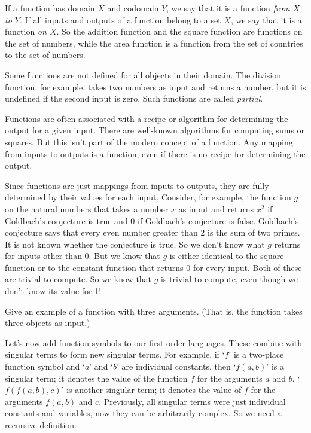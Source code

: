 If a function has domain $X$ and codomain $Y$,
we say that it is a function \emph{from $X$ to $Y$}.
If all inputs and outputs of a function belong to a set $X$,
we say that it is a function \emph{on $X$}.
So the addition function and the square function are functions on the set of numbers,
while the area function is a function from the set of countries to the set of numbers.

Some functions are not defined for all objects in their domain.
The division function, for example, takes two numbers as input and returns a number,
but it is undefined if the second input is zero.
Such functions are called \emph{partial}.

Functions are often associated with a recipe or algorithm
for determining the output for a given input.
There are well-known algorithms for computing sums or squares.
But this isn't part of the modern concept of a function.
Any mapping from inputs to outputs is a function,
even if there is no recipe for determining the output.

Since functions are just mappings from inputs to outputs,
they are fully determined by their values for each input.
Consider, for example, the function $g$ on the natural numbers that
takes a number $x$ as input and returns
$x^{2}$ if Goldbach's conjecture is true
and $0$ if Goldbach's conjecture is false.
Goldbach's conjecture says that
every even number greater than 2 is the sum of two primes.
It is not known whether the conjecture is true.
So we don't know what $g$ returns for inputs other than 0.
But we know that
$g$ is either identical to the square function or
to the constant function that returns 0 for every input.
Both of these are trivial to compute.
So we know that $g$ is trivial to compute,
even though we don't know its value for 1!

\begin{exercise}
  Give an example of a function with three arguments.
  (That is, the function takes three objects as input.)
\end{exercise}

Let's now add function symbols to our first-order languages.
These combine with singular terms to form new singular terms.
For example,
if `$f$' is a two-place function symbol and `$a$' and `$b$' are individual constants,
then `$f(a,b)$' is a singular term;
it denotes the value of the function $f$ for the arguments $a$ and $b$.
`$f(f(a,b),c)$' is another singular term;
it denotes the value of $f$ for the arguments $f(a,b)$ and $c$.
Previously,
all singular terms were just individual constants and variables,
now they can be arbitrarily complex.
So we need a recursive definition.

